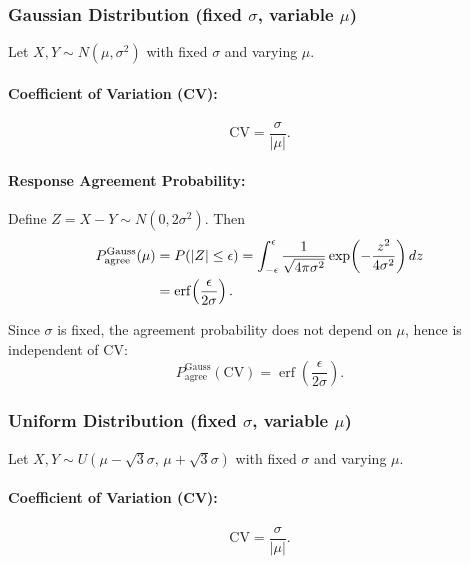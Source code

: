 \documentclass[11pt]{article}
\theoremstyle{remark}
\theoremstyle{definition}
\begin{document}
\subsubsection{Gaussian Distribution (fixed \(\sigma\), variable \(\mu\))}

Let \(X, Y \sim N(\mu, \sigma^2)\) with fixed \(\sigma\) and varying \(\mu\).

\paragraph{Coefficient of Variation (CV):}
\begin{equation}
\mathrm{CV} = \frac{\sigma}{|\mu|}.
\end{equation}

\paragraph{Response Agreement Probability:}
Define \(Z = X-Y \sim N(0, 2\sigma^2)\). Then
\begin{align}
P_{\mathrm{agree}}^{\text{Gauss}}(\mu)
&= P(|Z|\leq \epsilon)
= \int_{-\epsilon}^{\epsilon}\frac{1}{\sqrt{4\pi\sigma^2}}
\exp\!\left(-\frac{z^2}{4\sigma^2}\right)dz \notag \\
&= \operatorname{erf}\!\left(\frac{\epsilon}{2\sigma}\right).
\end{align}

Since \(\sigma\) is fixed, the agreement probability does not depend on \(\mu\), hence is independent of CV:
\begin{equation}
P_{\mathrm{agree}}^{\text{Gauss}}(\mathrm{CV}) = \operatorname{erf}\!\left(\frac{\epsilon}{2\sigma}\right).
\end{equation}

\subsubsection{Uniform Distribution (fixed \(\sigma\), variable \(\mu\))}

Let \(X, Y \sim U(\mu-\sqrt{3}\sigma,\,\mu+\sqrt{3}\sigma)\) with fixed \(\sigma\) and varying \(\mu\).

\paragraph{Coefficient of Variation (CV):}
\begin{equation}
\mathrm{CV} = \frac{\sigma}{|\mu|}.
\end{equation}
\end{document}
